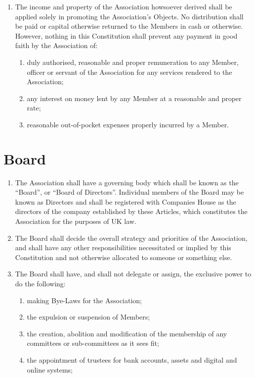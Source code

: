 \documentclass[10pt]{mk-articles-of-association}
\newcommand{\mysection}[1]{
  \end{enumerate}
  \section*{#1}
  \begin{enumerate}[resume]
}
\newcommand{\EC}[0]{Board}
\newcommand{\Exec}[0]{\EC{} }
\begin{document}
\begin{enumerate}
\item
  The income and property of the Association howsoever derived shall be
  applied solely in promoting the Association’s Objects. No distribution shall
  be paid or capital otherwise returned to the Members in cash or otherwise.
  However, nothing in this Constitution shall prevent any payment in good
  faith by the Association of:
  \begin{enumerate}
  \item duly authorised, reasonable and proper remuneration to any Member,
    officer or servant of the Association for any services rendered to the
    Association;
  \item any interest on money lent by any Member at a reasonable and proper
    rate; \ITor
  \item reasonable out-of-pocket expenses properly incurred by a Member.
  \end{enumerate}



\mysection{\Exec}

  \item The Association shall have a governing body which shall be
    known as the ``\EC{}'', or ``Board of Directors''. Individual
    members of the \Exec may be known as Directors and shall be
    registered with Companies House as the directors of the company
    established by these Articles, which constitutes the Association
    for the purposes of UK law.

  \item The \Exec shall decide the overall strategy and priorities of
    the Association, and shall have any other responsibilities
    necessitated or implied by this Constitution and not otherwise
    allocated to someone or something else.

  \item The \Exec shall have, and
    shall not delegate or assign, the exclusive power to do the
    following:\label{nondelegation}

    \begin{enumerate}
      \item making Bye-Laws for the Association;

      \item the expulsion or suspension of Members;

      \item the creation, abolition and modification of the membership of
        any committees or sub-committees as it sees fit;

      \item the appointment of trustees for bank accounts, assets and
        digital and online systems; \ITand


\end{enumerate}
\end{enumerate}
\end{document}
